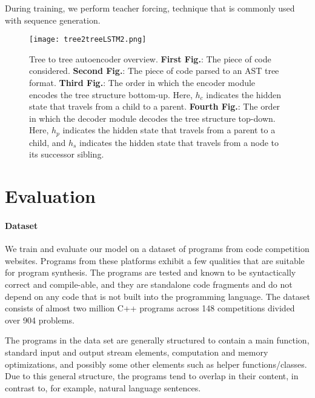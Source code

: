 During training, we perform teacher forcing, technique that is commonly used with sequence generation.

\begin{figure}[ht!]
    \centering
    \texttt{[image: tree2treeLSTM2.png]}
    \caption[Tree2Tree model high-level overview]{Tree to tree autoencoder overview. \textbf{First Fig.}: The piece of code considered. \textbf{Second Fig.}: The piece of code parsed to an AST tree format. \textbf{Third Fig.}: The order in which the encoder module encodes the tree structure bottom-up. Here, $h_c$ indicates the hidden state that travels from a child to a parent. \textbf{Fourth Fig.}: The order in which the decoder module decodes the tree structure top-down. Here, $h_p$ indicates the hidden state that travels from a parent to a child, and $h_s$ indicates the hidden state that travels from a node to its successor sibling.}
    \label{fig:tree2treeVAE}
\end{figure}

\newpage
\section{Evaluation}
\label{sec:tree2tree-eval}

\paragraph{Dataset}
We train and evaluate our model on a dataset of programs from code competition websites. Programs from these platforms exhibit a few qualities that are suitable for program synthesis. The programs are tested and known to be syntactically correct and compile-able, and they are standalone code fragments and do not depend on any code that is not built into the programming language. The dataset consists of almost two million C++ programs across 148 competitions divided over 904 problems. 

The programs in the data set are generally structured to contain a main function, standard input and output stream elements, computation and memory optimizations, and possibly some other elements such as helper functions/classes. Due to this general structure, the programs tend to overlap in their content, in contrast to, for example, natural language sentences. 

